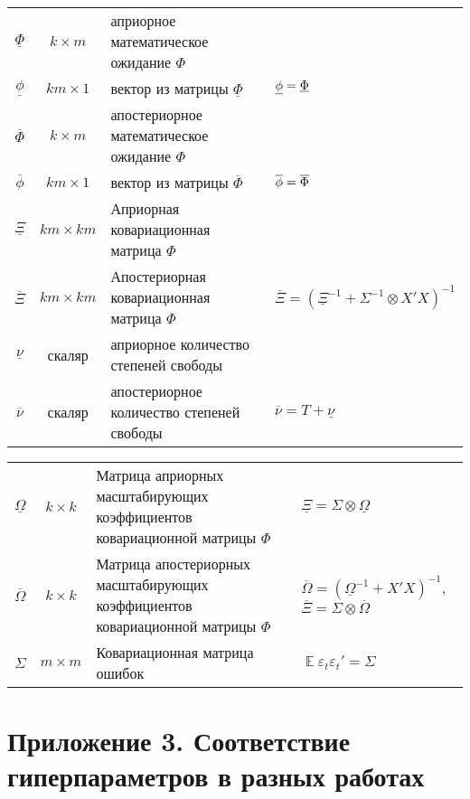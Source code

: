 \documentclass[11pt]{article} %
\DeclareMathOperator{\E}{\mathbb{E}}
\newcommand{\prior}{\underline}
\newcommand{\post}{\overline}
\let\vec\relax
\DeclareMathOperator{\vec}{vec}
\begin{document}
\begin{center}
\begin{tabular}{ccp{6cm}l}
\midrule %
$\prior \Phi$ & $k \times m$ & априорное математическое ожидание $\Phi$ &  \\
$\prior \phi$ & $km \times 1$ & вектор из матрицы $\prior \Phi$  & $\prior \phi = \vec{ \prior \Phi}$ \\
$\post \Phi$ & $k \times m$ & апостериорное математическое ожидание $\Phi$ & \\
$\post \phi$ & $km \times 1$ & вектор из матрицы $\post \Phi$  & $\post \phi = \vec{ \post \Phi}$ \\
\midrule
$\prior \Xi $ & $km \times km$  & Априорная ковариационная матрица $\Phi$&\\
$\post \Xi $ & $km \times km$  & Апостериорная ковариационная матрица $\Phi$& $\post \Xi = (\prior \Xi^{-1} + \Sigma^{-1}\otimes X'X)^{-1}$ \\
$\prior \nu $ & скаляр & априорное количество степеней свободы & \\
$\post \nu $ & скаляр & апостериорное количество степеней свободы& $\post \nu = T + \prior \nu$ \\
\midrule %
\end{tabular}
\end{center}

\newpage
\begin{center}
\begin{tabular}{ccp{6cm}l}
\midrule
$\prior \Omega$ & $k \times k$ & Матрица априорных масштабирующих коэффициентов ковариационной матрицы $\Phi$& $\prior \Xi = \Sigma \otimes \prior \Omega$ \\
$\post \Omega$ & $k \times k$ & Матрица апостериорных масштабирующих коэффициентов ковариационной матрицы $\Phi$&  $\post \Omega = (\prior\Omega^{-1}+ X'X)^{-1}$,  $\post \Xi = \Sigma \otimes \post \Omega$\\
$\Sigma$ & $m \times m$ &Ковариационная матрица ошибок& $\E\varepsilon_t \varepsilon _t'=\Sigma$\\
\bottomrule
\end{tabular}
\end{center}
\newpage

\section*{Приложение 3. Соответствие гиперпараметров в разных работах}
\end{document}
